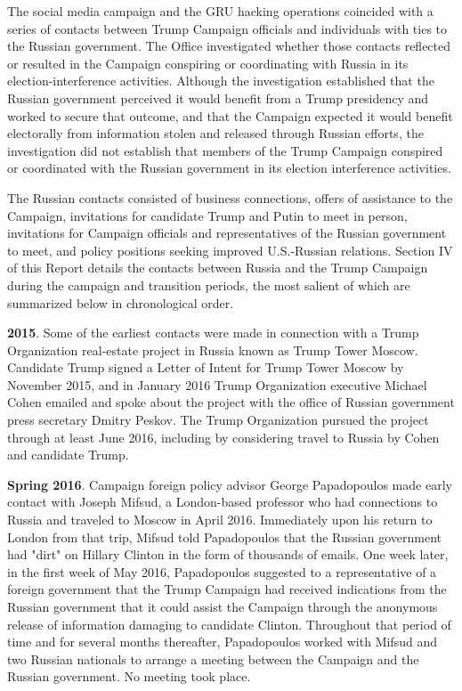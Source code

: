 \documentclass{article}
\begin{document}
The social media campaign and the GRU hacking operations coincided with a series of contacts between Trump Campaign officials and individuals with ties to the Russian government.
The Office investigated whether those contacts reflected or resulted in the Campaign conspiring or coordinating with Russia in its election-interference activities.
Although the investigation established that the Russian government perceived it would benefit from a Trump presidency and worked to secure that outcome, and that the Campaign expected it would benefit electorally from information stolen and released through Russian efforts, the investigation did not establish that members of the Trump Campaign conspired or coordinated with the Russian government in its election interference activities.

The Russian contacts consisted of business connections, offers of assistance to the Campaign, invitations for candidate Trump and Putin to meet in person, invitations for Campaign officials and representatives of the Russian government to meet, and policy positions seeking improved U.S.-Russian relations.
Section IV of this Report details the contacts between Russia and the Trump Campaign during the campaign and transition periods, the most salient of which are summarized below in chronological order.

\textbf{2015}.
Some of the earliest contacts were made in connection with a Trump Organization real-estate project in Russia known as Trump Tower Moscow.
Candidate Trump signed a Letter of Intent for Trump Tower Moscow by November 2015, and in January 2016 Trump Organization executive Michael Cohen emailed and spoke about the project with the office of Russian government press secretary Dmitry Peskov.
The Trump Organization pursued the project through at least June 2016, including by considering travel to Russia by Cohen and candidate Trump.

\textbf{Spring 2016}.
Campaign foreign policy advisor George Papadopoulos made early contact with Joseph Mifsud, a London-based professor who had connections to Russia and traveled to Moscow in April 2016.
Immediately upon his return to London from that trip, Mifsud told Papadopoulos that the Russian government had "dirt" on Hillary Clinton in the form of thousands of emails.
One week later, in the first week of May 2016, Papadopoulos suggested to a representative of a foreign government that the Trump Campaign had received indications from the Russian government that it could assist the Campaign through the anonymous release of information damaging to candidate Clinton.
Throughout that period of time and for several months thereafter, Papadopoulos worked with Mifsud and two Russian nationals to arrange a meeting between the Campaign and the Russian government.
No meeting took place.
\end{document}
